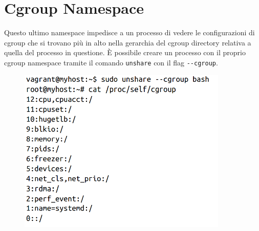 \section{Cgroup Namespace}

Questo ultimo namespace impedisce a un processo di vedere le configurazioni di
cgroup che si trovano più in alto nella gerarchia del cgroup directory relativa
a quella del processo in questione. È possibile creare un processo con il proprio
cgroup namespace tramite il comando \verb|unshare| con il flag \verb|--cgroup|.

\begin{figure}[H]
    \centering
    \includegraphics[width=10cm, keepaspectratio]{capitoli/os_security/imgs/cspace.png}
\end{figure}